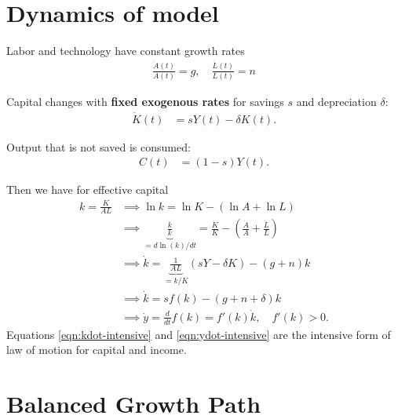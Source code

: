 \documentclass[../main.tex]{subfiles}
\begin{document}
    \section{Dynamics of model}
        
        Labor and technology have constant growth rates
        \begin{align}
            \frac{\dot A(t)}{A(t)} = g, \quad
            \frac{\dot L(t)}{L(t)} = n
        \end{align}
        
        Capital changes with \textbf{fixed exogenous rates} for savings $s$ and depreciation $\delta$:
        \begin{align}
            \dot K(t) &= sY(t) - \delta K(t).
        \end{align}
        
        Output that is not saved is consumed:
        \begin{align}
            C(t) &= (1-s)Y(t).
        \end{align}
        
        Then we have for effective capital
        \begin{align}
            k
            = \frac{K}{AL}
            &\implies
            \ln k = \ln K - (\ln A + \ln L)
            \\
            &\implies
            \underbrace{\frac{\dot k}{ k}}_{= d\ln(k) / dt}
            = \frac{\dot K}{K} - \left(\frac{\dot A}{A} + \frac{\dot L}{L}\right)
            \\
            &\implies
            \dot{k} =
            \underbrace{\frac{1}{AL}}_{=k/K} (sY - \delta K) - \left(g + n\right) k
            \\
            &\implies
            \dot k = s f(k) - (g + n + \delta) k
            \label{eqn:kdot-intensive}
            \\
            &\implies
            \dot y = \frac{d}{dt} f(k) = f'(k) \dot k,
            \quad f'(k) > 0.
            \label{eqn:ydot-intensive}
        \end{align}
        Equations \eqref{eqn:kdot-intensive} and \eqref{eqn:ydot-intensive} are the intensive form of law of motion for capital and income.
        
        
    \section{Balanced Growth Path}
        
\end{document}
